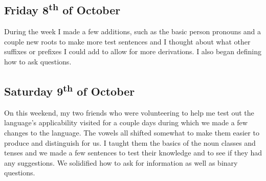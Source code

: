 \documentclass[a4paper,10pt]{article}
\begin{document}
\subsection{Friday 8\textsuperscript{th} of October}
During the week I made a few additions, such as the basic person pronouns and a couple new
roots to make more test sentences and I thought about what other suffixes or prefixes I
could add to allow for more derivations. I also began defining how to ask questions.

\subsection{Saturday 9\textsuperscript{th} of October}
On this weekend, my two friends who were volunteering to help me test out the language's
applicability visited for a couple days during which we made a few changes to the language.
The vowels all shifted somewhat to make them easier to produce and distinguish for us. I
taught them the basics of the noun classes and tenses and we made a few sentences to test
their knowledge and to see if they had any suggestions. We solidified how to ask for
information as well as binary questions. 
\end{document}
